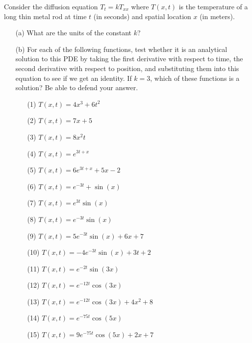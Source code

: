 \begin{problem}
    Consider the diffusion equation $T_t = k T_{xx}$ where $T(x,t)$ is the temperature of a long
    thin metal rod at time $t$ (in seconds) and spatial location $x$ (in meters).   
    \begin{enumerate}
        \item[(a)] What are the units of the constant $k$?
        \item[(b)] For each of the following functions, test whether it is an analytical
            solution to this PDE by taking the first derivative with respect to time, the
            second derivative with respect to position, and substituting them into this
            equation to see if we get an identity.  If $k = 3$, which of these functions
            is a solution? Be able to defend your answer.

            \begin{enumerate}
                \item[(1)] $T(x,t) = 4 x^3 + 6 t^2$
                \item[(2)] $T(x,t) = 7 x + 5$
                \item[(3)] $T(x,t) = 8 x^2 t$
                \item[(4)] $T(x,t) = e^{3 t + x}$
                \item[(5)] $T(x,t) = 6 e^{3 t + x} +5x - 2$
                \item[(6)] $T(x,t) = e^{-3t} + \sin (x)$
                \item[(7)] $T(x,t) = e^{3t} \sin (x)$
                \item[(8)] $T(x,t) = e^{-3t} \sin (x)$
                \item[(9)] $T(x,t) = 5 e^{-3t} \sin (x) + 6x + 7$
                \item[(10)] $T(x,t) = -4 e^{-3t} \sin (x) + 3t + 2$
                \item[(11)] $T(x,t) = e^{-2t} \sin (3x)$
                \item[(12)] $T(x,t) = e^{-12 t} \cos (3x)$
                \item[(13)] $T(x,t) = e^{-12 t} \cos (3x)+4x^2 + 8$
                \item[(14)] $T(x,t) = e^{-75 t} \cos (5x)$
                \item[(15)] $T(x,t) = 9 e^{-75 t} \cos (5x) + 2 x + 7$
            \end{enumerate}
    \end{enumerate}
\end{problem}





